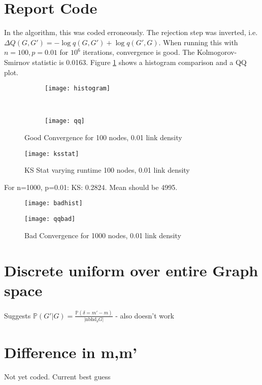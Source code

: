 \documentclass[10pt,a4paper]{article}
\begin{document}
  \section{Report Code}
  In the algorithm, this was coded erroneously. The rejection step was inverted, i.e. \(\Delta Q(G,G') = -\log q(G,G')+\log q(G',G)\). When running this with \(n=100, p=0.01\) for \(10^6\) iterations, convergence is good. The Kolmogorov-Smirnov statistic is 0.0163. Figure \ref{fig:goodhist} shows a histogram comparison and a QQ plot.
  \begin{figure}[h]
  	\centering
  	\begin{subfigure}{\textwidth}
  		\texttt{[image: histogram]}
  	\end{subfigure}\\%
  	\begin{subfigure}{\textwidth}
	\texttt{[image: qq]}
\end{subfigure}
\caption{Good Convergence for 100 nodes, 0.01 link density}
\label{fig:goodhist}
  \end{figure}
  \begin{figure}[h]\label{fig:ksstat}
	\centering
		\texttt{[image: ksstat]}
	\caption{KS Stat varying runtime 100 nodes, 0.01 link density}

\end{figure}

For n=1000, p=0.01: KS: 0.2824. Mean should be 4995. 

	\begin{figure}[h]
		\texttt{[image: badhist]}
	\end{figure}
	\begin{figure}[h]
		\texttt{[image: qqbad]}
			\caption{Bad Convergence for 1000 nodes, 0.01 link density}
		\label{fig:badhist}
	\end{figure}



 \section{Discrete uniform over entire Graph space}
 Suggests \(\mathbb{P}(G'|G) = \frac{\mathbb{P}(\delta=m'-m)}{|\text{nbhd}_{\delta}G|}\) - also doesn't work
 \section{Difference in  m,m'}
 Not yet coded. Current best guess
 
\end{document}
